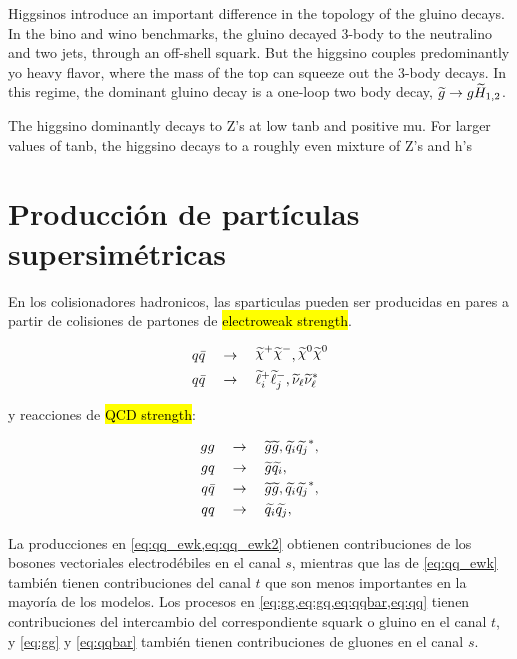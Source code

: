 Higgsinos introduce  an important difference in the topology of the gluino decays. In the bino and wino benchmarks, the gluino decayed 3-body to the neutralino and two jets,
through an off-shell squark. But the higgsino couples predominantly yo heavy flavor, where the mass of the top can squeeze out the 3-body decays. In this regime, the dominant gluino decay is
a one-loop two body decay, $\widetilde{g}\rightarrow g\widetilde{H}_{1,2}$.


The higgsino dominantly decays to Z's at low tanb and positive mu. For larger values of tanb, the higgsino decays to a roughly even mixture of Z's and h's


\section{Producción de partículas supersimétricas} %


En los colisionadores hadronicos, las sparticulas pueden ser producidas en pares a partir
de colisiones de partones de \hl{electroweak strength}.

\begin{align}
  &q\bar{q} \quad \to \quad \chinop \chinom, \nino \nino \label{eq:qq_ewk} \\
  &q\bar{q} \quad \to \quad \susy{\ell}^{+}_{i}\susy{\ell}^{-}_{j}, \susy{\nu}_{\ell}\susy{\nu}^{*}_{\ell} \label{qq_ewk2}\\
\end{align}

y reacciones de \hl{QCD strength}:

\begin{align}
  gg \quad &\rightarrow \quad \widetilde{g}\widetilde{g}, \widetilde{q_i}\widetilde{q_j}^{*}, \label{eq:gg}\\
  gq \quad &\rightarrow \quad \widetilde{g}\widetilde{q_i}, \label{eq:gq} \\
  q\bar{q} \quad &\rightarrow \quad \widetilde{g}\widetilde{g}, \widetilde{q_i}\widetilde{q_j}^{*}, \label{eq:qqbar} \\
  qq \quad &\rightarrow \quad \widetilde{q_i}\widetilde{q_j}, \label{eq:qq} \\
\end{align}

La producciones en \cref{eq:qq_ewk,eq:qq_ewk2}  obtienen contribuciones de los bosones vectoriales
electrodébiles en el canal $s$, mientras que las de \cref{eq:qq_ewk} también tienen contribuciones
del canal $t$ que son menos importantes en la mayoría de los modelos.
Los procesos en \cref{eq:gg,eq:gq,eq:qqbar,eq:qq} tienen contribuciones del intercambio
del correspondiente squark o gluino en el canal $t$, y \cref{eq:gg} y \cref{eq:qqbar}
también tienen contribuciones de gluones en el canal $s$.

